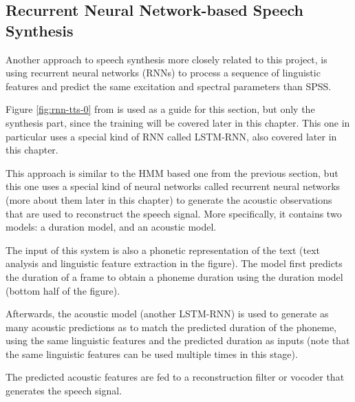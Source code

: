 

\subsection{Recurrent Neural Network-based Speech Synthesis} \label{sec:rnn-tts}

Another approach to speech synthesis more closely related to this project, is using recurrent neural networks (RNNs) to process a sequence of linguistic features and predict the same excitation and spectral parameters than SPSS.

Figure \ref{fig:rnn-tts-0} from \cite{chen1998rnn} is used as a guide for this section, but only the synthesis part, since the training will be covered later in this chapter. This one in particular uses a special kind of RNN called LSTM-RNN, also covered later in this chapter.

This approach is similar to the HMM based one from the previous section, but this one uses a special kind of neural networks called recurrent neural networks (more about them later in this chapter) to generate the acoustic observations that are used to reconstruct the speech signal. More specifically, it contains two models: a duration model, and an acoustic model.

The input of this system is also a phonetic representation of the text (text analysis and linguistic feature extraction in the figure). The model first predicts the duration of a frame to obtain a phoneme duration using the duration model (bottom half of the figure).

Afterwards, the acoustic model (another LSTM-RNN) is used to generate as many acoustic predictions as to match the predicted duration of the phoneme, using the same linguistic features and the predicted duration as inputs (note that the same linguistic features can be used multiple times in this stage).

The predicted acoustic features are fed to a reconstruction filter or vocoder that generates the speech signal.


